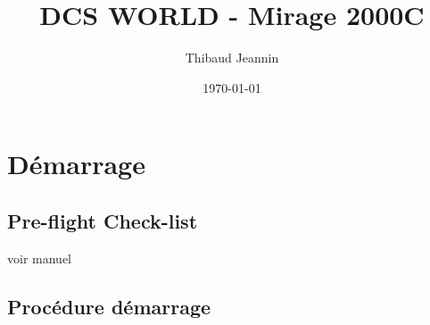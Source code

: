 \documentclass[12pt]{article}
\title{DCS WORLD - Mirage 2000C}
\author{Thibaud Jeannin}
\date{\today}
\begin{document}
\maketitle

\newpage
\section{Démarrage}
\subsection{Pre-flight Check-list}
voir manuel

\subsection{Procédure démarrage}
\end{document}
